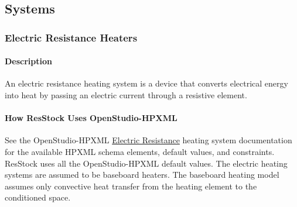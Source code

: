 \subsection{Systems}\label{build_model_systems}
\subsubsection{Electric Resistance Heaters}

\paragraph{Description} %

An electric resistance heating system is a device that converts electrical energy into heat by passing an electric current through a resistive element.

\paragraph{How ResStock Uses OpenStudio-HPXML}

See the OpenStudio-HPXML \href{https://openstudio-hpxml.readthedocs.io/en/v1.8.1/workflow_inputs.html#electric-resistance}{Electric Resistance} heating system documentation for the available HPXML schema elements, default values, and constraints. ResStock uses all the OpenStudio-HPXML default values. The electric heating systems are assumed to be baseboard heaters. The baseboard heating model assumes only convective heat transfer from the heating element to the conditioned space. 

